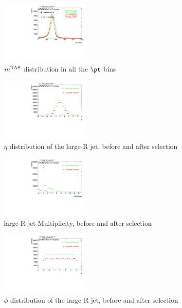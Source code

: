 \begin{figure}
 
\includegraphics[width=0.4\textwidth]{appendixB/mTAS_W_calibmCal_20:07:01-03-11-2016/1cfrt_h_FatJet_aftersel_m.pdf}
\caption{$m^\textrm{TAS}$ distribution in all the $\pt$ bins}
 
\end{figure}
 
\begin{figure}
 
\includegraphics[width=0.4\textwidth]{appendixB/mTAS_W_calibmCal_20:07:01-03-11-2016/1cfrt_h_FatJet_eta.pdf}
\caption{$\eta$ distribution of the large-R jet, before and after selection}
 
\end{figure}

\begin{figure}
 
\includegraphics[width=0.4\textwidth]{appendixB/mTAS_W_calibmCal_20:07:01-03-11-2016/1cfrt_h_FatJet_mult.pdf}
\caption{large-R jet Multiplicity, before and after selection}
 
\end{figure}
 
\begin{figure}
 
\includegraphics[width=0.4\textwidth]{appendixB/mTAS_W_calibmCal_20:07:01-03-11-2016/1cfrt_h_FatJet_psi.pdf}
\caption{$\phi$ distribution of the large-R jet, before and after selection}
 
\end{figure}
 
